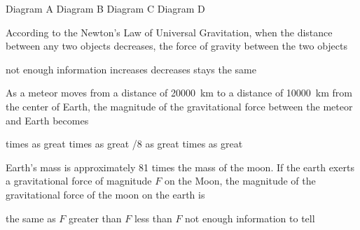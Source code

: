 \documentclass[answers]{exam}
\begin{document}
\begin{questions}
{\color{white} \tiny
\begin{randomizeoneparchoices}[norandomize]
    \correctchoice Diagram A \hspace{1cm}
    \choice Diagram B \hspace{1cm}
    \choice Diagram C \hspace{1cm}
    \choice Diagram D \hspace{1cm}
\end{randomizeoneparchoices}
}

\question
According to the Newton’s Law of Universal Gravitation, when the distance between any two objects decreases, the force of gravity between the two objects

\begin{randomizechoices}[norandomize]
    \choice not enough information
    \correctchoice increases
    \choice decreases
    \choice stays the same    
\end{randomizechoices}


\question %

As a meteor moves from a distance of \SI[group-separator={,}]{20000}{km} to a distance of \SI[group-separator={,}]{10000}{km} from the center of Earth, the magnitude of the gravitational force between the meteor and Earth becomes

\begin{randomizeoneparchoices}[norandomize]
     times as great
     times as great
    /8 as great
     times as great
\end{randomizeoneparchoices}

\question
Earth’s mass is approximately 81 times the mass of the moon.  If the earth exerts a gravitational force of magnitude $F$ on the Moon, the magnitude of the gravitational force of the moon on the earth is

\begin{randomizechoices}[norandomize]
    \correctchoice the same as $F$
    \choice greater than $F$
    \choice less than $F$
    \choice not enough information to tell
\end{randomizechoices}


\end{questions}
\end{document}
